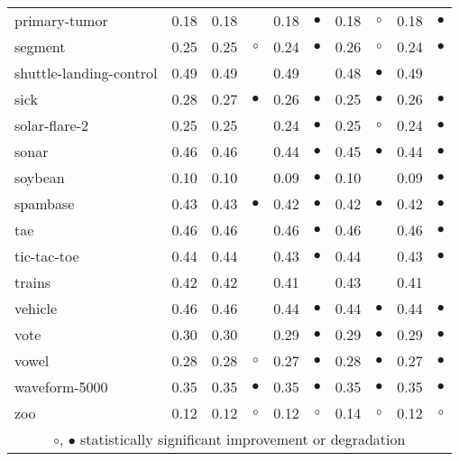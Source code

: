 {\begin{longtable}{lrr@{\hspace{0.1cm}}cr@{\hspace{0.1cm}}cr@{\hspace{0.1cm}}cr@{\hspace{0.1cm}}c}
primary-tumor & 0.18 & 0.18 &           & 0.18 & $\bullet$ & 0.18 &    $\circ$ & 0.18 & $\bullet$\\
segment & 0.25 & 0.25 &   $\circ$ & 0.24 & $\bullet$ & 0.26 &    $\circ$ & 0.24 & $\bullet$\\
shuttle-landing-control & 0.49 & 0.49 &           & 0.49 &           & 0.48 &  $\bullet$ & 0.49 &          \\
sick & 0.28 & 0.27 & $\bullet$ & 0.26 & $\bullet$ & 0.25 &  $\bullet$ & 0.26 & $\bullet$\\
solar-flare-2 & 0.25 & 0.25 &           & 0.24 & $\bullet$ & 0.25 &    $\circ$ & 0.24 & $\bullet$\\
sonar & 0.46 & 0.46 &           & 0.44 & $\bullet$ & 0.45 &  $\bullet$ & 0.44 & $\bullet$\\
soybean & 0.10 & 0.10 &           & 0.09 & $\bullet$ & 0.10 &            & 0.09 & $\bullet$\\
spambase & 0.43 & 0.43 & $\bullet$ & 0.42 & $\bullet$ & 0.42 &  $\bullet$ & 0.42 & $\bullet$\\
tae & 0.46 & 0.46 &           & 0.46 & $\bullet$ & 0.46 &            & 0.46 & $\bullet$\\
tic-tac-toe & 0.44 & 0.44 &           & 0.43 & $\bullet$ & 0.44 &            & 0.43 & $\bullet$\\
trains & 0.42 & 0.42 &           & 0.41 &           & 0.43 &            & 0.41 &          \\
vehicle & 0.46 & 0.46 &           & 0.44 & $\bullet$ & 0.44 &  $\bullet$ & 0.44 & $\bullet$\\
vote & 0.30 & 0.30 &           & 0.29 & $\bullet$ & 0.29 &  $\bullet$ & 0.29 & $\bullet$\\
vowel & 0.28 & 0.28 &   $\circ$ & 0.27 & $\bullet$ & 0.28 &  $\bullet$ & 0.27 & $\bullet$\\
waveform-5000 & 0.35 & 0.35 & $\bullet$ & 0.35 & $\bullet$ & 0.35 &  $\bullet$ & 0.35 & $\bullet$\\
zoo & 0.12 & 0.12 &   $\circ$ & 0.12 &   $\circ$ & 0.14 &    $\circ$ & 0.12 &   $\circ$\\
\hline
\multicolumn{10}{c}{$\circ$, $\bullet$ statistically significant improvement or degradation}\\
\end{longtable} \footnotesize \par}